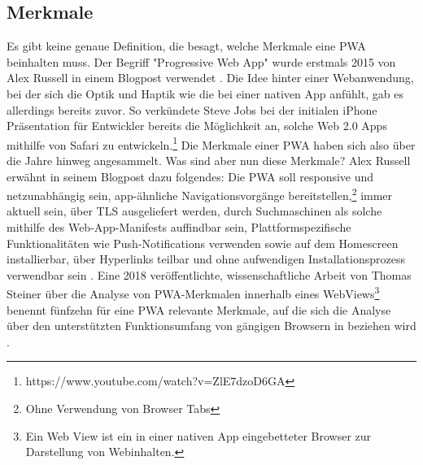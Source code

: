 \subsection{Merkmale}
\label{subsec:markmale}
Es gibt keine genaue Definition, die besagt, welche Merkmale eine PWA beinhalten muss.
Der Begriff "Progressive Web App" wurde erstmals 2015 von Alex Russell in einem Blogpost
verwendet \cite{PWA2015}. Die Idee hinter einer Webanwendung, bei der sich die Optik und Haptik
wie die bei einer nativen App anfühlt, gab es allerdings bereits zuvor. So verkündete
Steve Jobs bei der initialen iPhone Präsentation für Entwickler bereits die Möglichkeit
an, solche Web 2.0 Apps mithilfe von Safari zu entwickeln.\footnote{https://www.youtube.com/watch?v=ZlE7dzoD6GA}
Die Merkmale einer PWA haben sich also über die Jahre hinweg angesammelt. Was sind aber
nun diese Merkmale? Alex Russell erwähnt in seinem Blogpost dazu folgendes:
Die PWA soll responsive und netzunabhängig sein, app-ähnliche Navigationsvorgänge bereitstellen,\footnote{Ohne Verwendung von Browser Tabs} 
immer aktuell sein, über TLS ausgeliefert werden, durch Suchmaschinen als solche mithilfe
des Web-App-Manifests auffindbar sein, Plattformspezifische Funktionalitäten wie Push-Notifications
verwenden sowie auf dem Homescreen installierbar, über Hyperlinks teilbar und ohne aufwendigen
Installationsprozess verwendbar sein \cite{PWA2015}. Eine 2018 veröffentlichte, wissenschaftliche
Arbeit von Thomas Steiner über die Analyse von PWA-Merkmalen innerhalb eines WebViews\footnote{Ein Web View ist ein in einer nativen App eingebetteter Browser zur Darstellung von Webinhalten.}
benennt fünfzehn für eine PWA relevante Merkmale, auf die sich die Analyse über den
unterstützten Funktionsumfang von gängigen Browsern in 
beziehen wird \cite{WhatIsInAWebView}.

